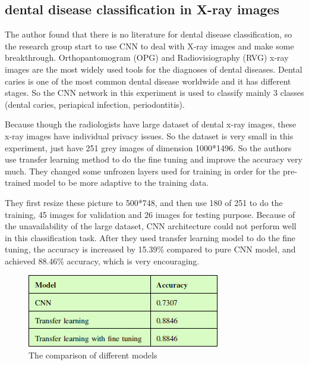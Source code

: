 \documentclass[10pt,twocolumn,letterpaper]{article}
\begin{document}
\subsection{dental disease classification in X-ray images}

The author found that there is no literature for dental disease classification, so the research group start to use CNN to deal with X-ray images and make some breakthrough. Orthopantomogram (OPG) and Radiovisiography (RVG) x-ray images are the most widely used tools for the diagnoses of dental diseases. Dental caries is one of the most common dental disease worldwide and it has different stages. So the CNN network in this experiment is used to classify mainly 3 classes (dental caries, periapical infection, periodontitis)\cite{prajapaticlassification}.

Because though the radiologists have large dataset of dental x-ray images, these x-ray images have individual privacy issues. So the dataset is very small in this experiment, just have 251 grey images of dimension 1000*1496. So the authors use transfer learning method to do the fine tuning and improve the accuracy very much. They changed some unfrozen layers used for training in order for the pre-trained model to be more adaptive to the training data. 

They first resize these picture to 500*748, and then use 180 of 251 to do the training, 45 images for validation and 26 images for testing purpose. Because of the unavailability of the large dataset, CNN architecture could not perform well in this classification task. After they used transfer learning model to do the fine tuning, the accuracy is increased by 15.39\% compared to pure CNN model, and achieved 88.46\% accuracy, which is very encouraging.

\begin{figure}[t]
	\begin{center}
		\includegraphics[width=0.8\linewidth]{2}
	\end{center}
	\caption{The comparison of different models} 
	\label{fig:long}
	\label{fig:onecol}
\end{figure}
\end{document}
